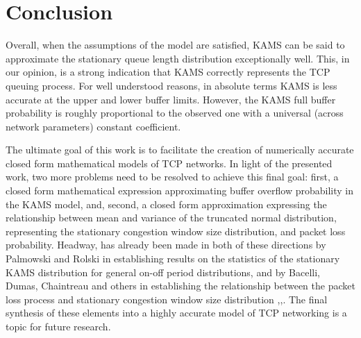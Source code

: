 \documentclass{IEEEtran}[10pt,letterpaper,conference]
\begin{document}
\section{Conclusion}
\label{conclusion}
Overall, when the assumptions of the model are satisfied, KAMS can be said to approximate the stationary queue length distribution exceptionally well. This, in our opinion, is a strong indication that KAMS correctly represents the TCP queuing process. For well understood reasons, in absolute terms KAMS is less accurate at the upper and lower buffer limits. However, the KAMS full buffer probability is roughly proportional to the observed one with a universal (across network parameters) constant coefficient.

The ultimate goal of this work is to facilitate the creation of numerically accurate closed form mathematical models of TCP networks. In light of the presented work, two more problems need to be resolved to achieve this final goal: first, a closed form mathematical expression approximating buffer overflow probability in the KAMS model, and, second, a closed form approximation expressing the relationship between mean and variance of the truncated normal distribution, representing the stationary congestion window size distribution, and packet loss probability. Headway, has already been made in both of these directions by Palmowski and Rolski in establishing results on the statistics of the stationary KAMS distribution for general on-off period distributions\cite{PalRol}, and by Bacelli, Dumas, Chaintreau and others in establishing the relationship between the packet loss process and stationary congestion window size distribution \cite{BacMcDonJul},\cite{DumFabPhi},\cite{ChaDeVle}. The final synthesis of these elements into a highly accurate model of TCP networking is a topic for future research.



\end{document}
